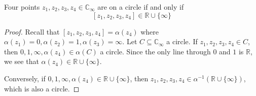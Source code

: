 \documentclass[10pt, a4paper, twoside]{report}
\begin{document}
\begin{corollary}
    Four points \(z_1,z_2,z_3,z_4\in\mathbb{C}_\infty\) are on a circle if and only if \[[z_1,z_2,z_3,z_4]\in\mathbb{R}\cup\{\infty\}\]
\end{corollary}
\begin{proof}
    Recall that \([z_1,z_2,z_3,z_4]=\alpha(z_4)\) where \(\alpha(z_1)=0,\alpha(z_2)=1,\alpha(z_3)=\infty\).
    Let \(C\subseteq\mathbb{C}_\infty\) a circle. If \(z_1,z_2,z_3,z_4\in C\), then \(0,1,\infty,\alpha(z_4)\in \alpha(C)\) a circle. Since the only line through \(0\) and \(1\) is \(\mathbb{R}\), we see that \(\alpha(z_4)\in\mathbb{R}\cup\{\infty\}\).
    
    Conversely, if \(0,1,\infty,\alpha(z_4)\in\mathbb{R}\cup\{\infty\}\), then \(z_1,z_2,z_3,z_4\in\alpha^{-1}(\mathbb{R}\cup\{\infty\})\), which is also a circle.
\end{proof}
\end{document}

